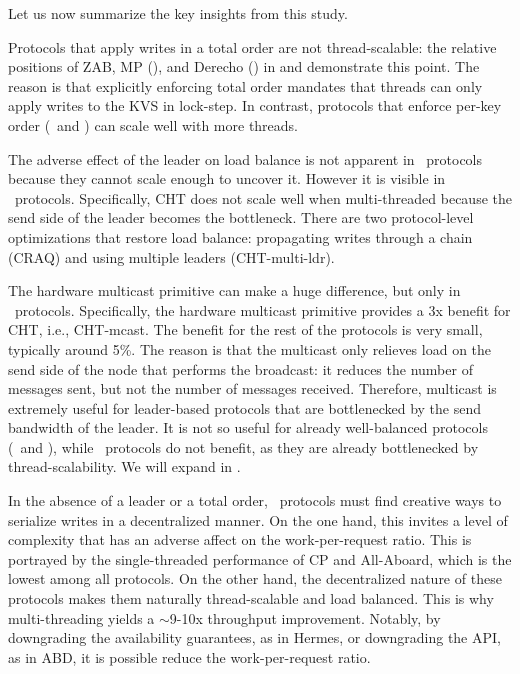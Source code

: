 \custvspace
\noindent
Let us now summarize the key insights from this study.


Protocols that apply writes in a total order are not thread-scalable:
the relative positions of ZAB, MP (\LTO), and Derecho (\DTO) in  and  demonstrate this point. The reason is that explicitly enforcing total order mandates that threads can only apply writes to the KVS in lock-step.
In contrast, protocols that enforce per-key order (\LPKO~and \DPKO) can scale well with more threads.

The adverse effect of the leader on load balance is not apparent in \LTO~protocols because they cannot scale enough to uncover it.
However it is visible in \LPKO~protocols.
Specifically, CHT does not scale well when multi-threaded because the send side of the leader becomes the bottleneck. %
There are two protocol-level optimizations that restore load balance: propagating writes through a chain (\ie CRAQ) and using multiple leaders (\ie CHT-multi-ldr).

The hardware multicast primitive can make a huge difference, but only in \LPKO~protocols.
Specifically, the hardware multicast primitive provides a 3x benefit for CHT, i.e., CHT-mcast. 
The benefit for the rest of the protocols is very small, typically around 5\%.
The reason is that the multicast only relieves load on the send side of the node that performs the broadcast: it reduces the number of messages sent, but not the number of messages received.
Therefore, multicast is extremely useful for leader-based protocols that are bottlenecked by the send bandwidth of the leader. It is not so useful for already well-balanced protocols (\ie \DTO\  and \DPKO), while \LTO\ protocols do not benefit, as they are already bottlenecked by thread-scalability. We will expand in .%

In the absence of a leader or a total order, \DPKO\ protocols must find creative ways to serialize writes in a decentralized manner.
On the one hand, this invites a level of complexity that has an adverse affect on the work-per-request ratio. 
This is portrayed by the single-threaded performance of CP and All-Aboard, which is the lowest among all protocols.
On the other hand, the decentralized nature of these protocols makes them
naturally thread-scalable and load balanced. This is why multi-threading yields a $\sim$9-10x throughput improvement.
Notably, by downgrading the availability guarantees, as in Hermes, or downgrading the API, as in ABD, it is possible reduce the work-per-request ratio.

